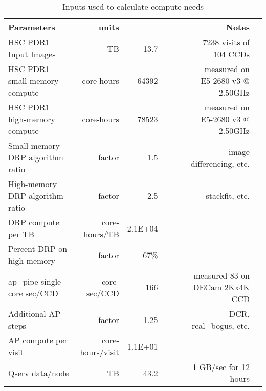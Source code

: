 \tiny \begin{longtable} { |p{}  |r  |r  |r  |r  |r  |r  |r |} 
\caption{Inputs used to calculate compute needs \label{tab:computeSizing}}\\ 
\hline 
\textbf{Parameters}&\textbf{units}&\textbf{}&\textbf{}&\textbf{}&\textbf{}&\textbf{Notes} \\ \hline
{HSC PDR1 Input Images}&{TB}&{13.7}&{}&{}&{}&{7238 visits of 104 CCDs} \\ \hline
{HSC PDR1 small-memory compute}&{core-hours}&{64392}&{}&{}&{}&{measured on E5-2680 v3 @ 2.50GHz} \\ \hline
{HSC PDR1 high-memory compute}&{core-hours}&{78523}&{}&{}&{}&{measured on E5-2680 v3 @ 2.50GHz} \\ \hline
{Small-memory DRP algorithm ratio}&{factor}&{1.5}&{}&{}&{}&{image differencing, etc.} \\ \hline
{High-memory DRP algorithm ratio}&{factor}&{2.5}&{}&{}&{}&{stackfit, etc.} \\ \hline
{DRP compute per TB}&{core-hours/TB}&{2.1E+04}&&&& \\ \hline
{Percent DRP on high-memory}&{factor}&{67\%}&&&& \\ \hline
{ap\_pipe single-core sec/CCD}&{core-sec/CCD}&{166}&{}&{}&{}&{measured 83 on DECam 2Kx4K CCD} \\ \hline
{Additional AP steps}&{factor}&{1.25}&{}&{}&{}&{DCR, real\_bogus, etc.} \\ \hline
{AP compute per visit}&{core-hours/visit}&{1.1E+01}&&&& \\ \hline
{Qserv data/node}&{TB}&{43.2}&{}&{}&{}&{1 GB/sec for 12 hours} \\ \hline
\end{longtable} \normalsize
